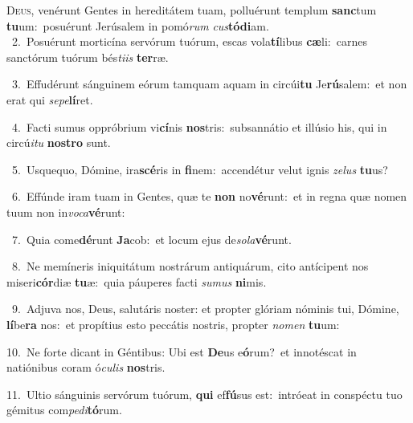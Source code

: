 \lettrine{\initial\textcolor{\initialcolor}{D}}{eus,} venérunt Gentes in hereditátem tuam, polluérunt templum \textbf{sanc}\-tum \textbf{tu}\-um:~\star posuérunt Jerúsalem in pomó\textit{rum} \textit{cus}\-\textbf{tó}\textbf{di}am.\\
{\numbfont\textcolor{\numbcolor}{~2.}}~Posuérunt morticína servórum tuórum, escas vola\-\textbf{tí}\-libus \textbf{cæ}\-li:~\star carnes sanctórum tuórum bés\-\textit{ti}\-\textit{is} \textbf{ter}\-ræ.\par
{\numbfont\textcolor{\numbcolor}{~3.}}~Effudérunt sánguinem eórum tamquam aquam in circúi\textbf{tu} Je\-\textbf{rú}\-salem:~\star et non erat qui \textit{se}\-\textit{pe}\textbf{lí}ret.\par
{\numbfont\textcolor{\numbcolor}{~4.}}~Facti sumus oppróbrium vi\-\textbf{cí}\-nis \textbf{nos}\-tris:~\star subsannátio et illúsio his, qui in circú\-\textit{i}\-\textit{tu} \textbf{nos}\-\textbf{tro} sunt.\par
{\numbfont\textcolor{\numbcolor}{~5.}}~Usquequo, Dómine, ira\-\textbf{scé}\-ris in \textbf{fi}\-nem:~\star accendétur velut ignis \textit{ze}\-\textit{lus} \textbf{tu}\-us?\par
{\numbfont\textcolor{\numbcolor}{~6.}}~Effúnde iram tuam in Gentes, quæ te \textbf{non} no\-\textbf{vé}\-runt:~\star et in regna quæ nomen tuum non in\-\textit{vo}\-\textit{ca}\textbf{vé}runt:\par
{\numbfont\textcolor{\numbcolor}{~7.}}~Quia come\-\textbf{dé}\-runt \textbf{Ja}\-cob:~\star et locum ejus de\-\textit{so}\-\textit{la}\textbf{vé}runt.\par
{\numbfont\textcolor{\numbcolor}{~8.}}~Ne memíneris iniquitátum nostrárum antiquárum, cito antícipent nos miseri\-\textbf{cór}\-diæ \textbf{tu}\-æ:~\star quia páuperes facti \textit{su}\-\textit{mus} \textbf{ni}\-mis.\par
{\numbfont\textcolor{\numbcolor}{~9.}}~Adjuva nos, Deus, salutáris noster: et propter glóriam nóminis tui, Dómine, \textbf{lí}\-be\textbf{ra} nos:~\star et propítius esto peccátis nostris, propter \textit{no}\-\textit{men} \textbf{tu}\-um:\par
{\numbfont\textcolor{\numbcolor}{10.}}~Ne forte dicant in Géntibus: Ubi est \textbf{De}\-us e\-\textbf{ó}\-rum?~\star et innotéscat in natiónibus coram ó\-\textit{cu}\-\textit{lis} \textbf{nos}\-tris.\par
{\numbfont\textcolor{\numbcolor}{11.}}~Ultio sánguinis servórum tuórum, \textbf{qui} ef\-\textbf{fú}\-sus est:~\star intróeat in conspéctu tuo gémitus com\-\textit{pe}\-\textit{di}\textbf{tó}rum.\par
